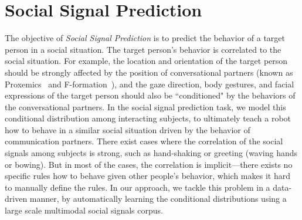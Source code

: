 

\section{Social Signal Prediction}
The objective of \emph{Social Signal Prediction} is to predict the behavior of a target person in a social situation. The target person's behavior is correlated to the social situation. For example, the location and orientation of the target person should be strongly affected by the position of conversational partners (known as Proxemics~\cite{Hall66} and F-formation~\cite{kendon90}), and the gaze direction, body gestures, and facial expressions of the target person should also be ``conditioned" by the behaviors of the conversational partners. In the social signal prediction task, we model this conditional distribution among interacting subjects, to ultimately teach a robot how to behave in a similar social situation driven by the behavior of communication partners. There exist cases where the correlation of the social signals among subjects is strong, such as hand-shaking or greeting (waving hands or bowing). But in most of the cases, the correlation is implicit---there exists no specific rules how to behave given other people's behavior, which makes it hard to manually define the rules. In our approach, we tackle this problem in a data-driven manner, by automatically learning the conditional distributions using a large scale multimodal social signals corpus.  

